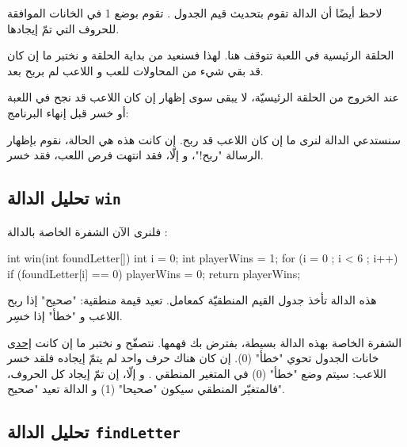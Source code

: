 \begin{information}
لاحظ أيضًا أن الدالة
تقوم بتحديث قيم الجدول
.
تقوم بوضع 1 في الخانات الموافقة للحروف التي تمّ إيجادها.
\end{information}

الحلقة الرئيسية في اللعبة تتوقف هنا. لهذا فسنعيد من بداية الحلقة و نختبر ما إن كان قد بقي شيء من المحاولات للعب و اللاعب لم بربح بعد.

عند الخروج من الحلقة الرئيسيّة، لا يبقى سوى إظهار إن كان اللاعب قد نجح في اللعبة أو خسر قبل إنهاء البرنامج:

\begin{Csource}
if (win(foundLetter))
	printf("\n\nYou win ! the secret word is : %
else
	printf("\n\nYou lose ! the secret word is : %
return 0;
}
\end{Csource}

سنستدعي الدالة
لنرى ما إن كان اللاعب قد ربح. إن كانت هذه هي الحالة، نقوم بإظهار الرسالة "ربح!"، و إلّا، فقد انتهت فرص اللعب، فقد خسر.

\subsection{تحليل الدالة \texttt{win}}

فلنرى الآن الشفرة الخاصة بالدالة
 :

\begin{Csource}
int win(int foundLetter[])
{
  int i = 0;
  int playerWins = 1;
  for (i = 0 ; i < 6 ; i++)
  {
    if (foundLetter[i] == 0)
    	playerWins = 0;
  }
  return playerWins;
}
\end{Csource}

هذه الدالة تأخذ جدول القيم المنطقيّة
كمعامل. تعيد قيمة منطقية: "صحيح" إذا ربح اللاعب و "خطأ" إذا خسِر.

الشفرة الخاصة بهذه الدالة بسيطة، بفترض بك فهمها. نتصفّح
و نختبر ما إن كانت
\underline{إحدى}
خانات الجدول تحوي "خطأ" (0). إن كان هناك حرف واحد لم يتمّ إيجاده فلقد خسر اللاعب: سيتم وضع "خطأ" (0) في المتغير المنطقي
.
و إلّا، إن تمّ إيجاد كل الحروف، فالمتغيّر المنطقي سيكون "صحيحا" (1) و الدالة تعيد "صحيح".

\subsection{تحليل الدالة \texttt{findLetter}}

